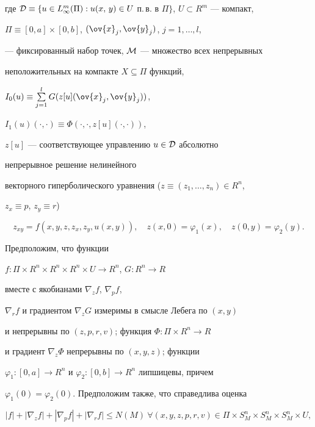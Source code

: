 где ${\cal D}\equiv\{u\in L_\infty^m(\Pi):u(x,\,y)\in


U$ п.\,в. в $\Pi\}$, $U\subset R^m$ --- компакт,


$\Pi\equiv[0,a]\times[0,b]$, $(\ov{x}_j, \ov{y}_j)$, $j=1,\dotsc,l$,


--- фиксированный набор точек, ${\cal M}$ --- множество всех непрерывных


неположительных на компакте $X\subseteq\Pi$ функций,


$I_0(u)\equiv\sum\limits_{j=1}^lG(z[u](\ov{x}_j, \ov{y}_j))$,


$I_1(u)(\cdot, \cdot)\equiv\Phi(\cdot, \cdot, z[u](\cdot, \cdot))$,


$z[u]$ --- соответствующее управлению $u\in{\cal D}$ абсолютно 


непрерывное решение нелинейного


векторного гиперболического уравнения ($z\equiv(z_1,\dotsc,z_n)\in R^n$,


$z_x\equiv p$,  $z_y\equiv r$)


\begin{equation}\label{equat}


z_{xy}=f(x,y,z,z_x,z_y,u(x,y)),\quad  z(x,0)=\varphi_1(x),\quad


z(0,y)=\varphi_2(y).


\end{equation}


Предположим, что функции


$f: \Pi\times R^n\times R^n\times R^n\times U\to R^n$, $G: R^n\to R$


вместе с якобианами $\nabla_zf$, $\nabla_pf$,


$\nabla_rf$ и градиентом $\nabla_zG$ измеримы в смысле Лебега по $(x,y)$


и непрерывны по $(z,p,r,v)$; функция $\Phi: \Pi\times R^n\to R$


и градиент $\nabla_z\Phi$ непрерывны по $(x,y,z)$; функции


$\varphi_1 :[0, a]\to R^n$ и $\varphi_2 :[0, b]\to R^n$ липшицевы, причем


$\varphi_1(0)=\varphi_2(0)$. Предположим также, что справедлива оценка


\begin{equation}


\label{eq12}


|f|+|\nabla_zf|+|\nabla_pf|+|\nabla_rf|\leq N(M)  


\ \forall


(x,y,z,p,r,v)\in\Pi\times S^n_M\times S^n_M\times S^n_M\times U,


\end{equation}



